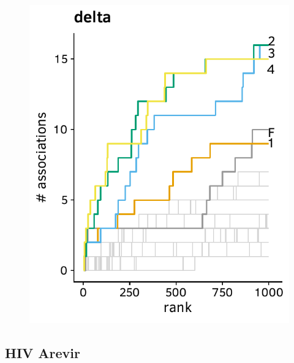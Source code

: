 \documentclass[a4paper,11pt]{article}
\begin{document}
\begin{figure}[H]
    \begin{minipage}{.49\textwidth}
      \includegraphics[width=\linewidth]{plots/comparison_plots/hdv_roggendorf/delta_new_map.pdf}
    \end{minipage}%
    \begin{minipage}{.49\textwidth}
    \end{minipage}
\end{figure}

\FloatBarrier
\subsection*{HIV Arevir}
\end{document}
